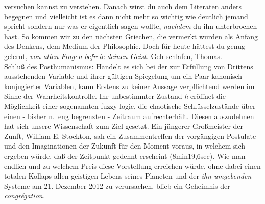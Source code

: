 \documentclass[
]{article}
\begin{document}
\begin{enumerate}
  versuchen kannst zu verstehen. Danach wirst du auch dem Literaten
  anders begegnen und vielleicht ist es dann nicht mehr so wichtig wie
  deutlich jemand spricht sondern nur was er eigentlich sagen wollte,
  \emph{nachdem} du ihn unterbrochen hast. So kommen wir zu den nächsten
  Griechen, die vermerkt wurden als Anfang des Denkens, dem Medium der
  Philosophie. Doch für heute hättest du genug gelernt, \emph{von allen
  Fragen befreie deinen Geist. }Geh schlafen, Thomas.\\
  Schluß des Posthumanismus: Handelt es sich bei der zur Erfüllung von
  Drittens ausstehenden Variable und ihrer gültigen Spiegelung um ein
  Paar kanonisch konjugierter Variablen, kann Erstens zu keiner Aussage
  verpflichtend werden im Sinne der Wahrheitskontrolle. Ihr unbestimmter
  Zustand \emph{h} eröffnet die Möglichkeit einer sogenannten fuzzy
  logic, die chaotische Schlüsselzustände über einen - bisher n.~eng
  begrenzten - Zeitraum aufrechterhält. Diesen auszudehnen hat sich
  unsere Wissenschaft zum Ziel gesetzt. Ein jüngerer Großmeister der
  Zunft, William E. Stockton, sah ein Zusammentreffen der vorgängigen
  Postulate und den Imaginationen der Zukunft für den Moment voraus, in
  welchem sich ergeben würde, daß der Zeitpunkt gedehnt erscheint
  (8min19,6sec). Wie man endlich und zu welchem Preis diese Vorstellung
  erreichen würde, ohne dabei einen totalen Kollaps allen geistigen
  Lebens seines Planeten und der \emph{ihn umgebenden} Systeme am 21.
  Dezember 2012 zu verursachen, blieb ein Geheimnis der
  \emph{congrégation.}
\end{enumerate}
\end{document}
